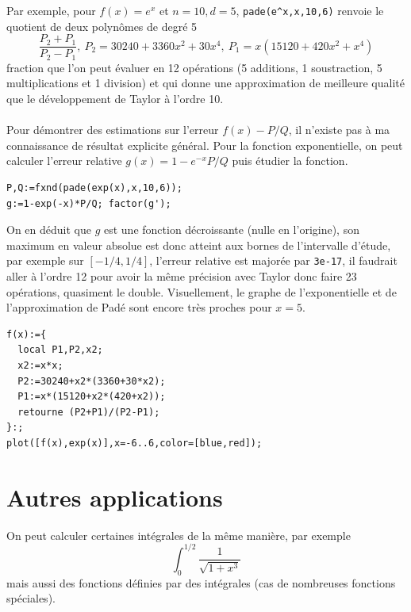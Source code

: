 \documentclass[a4paper,11pt]{book}
\begin{document}
\begin{giacjshere}
Par exemple, pour $f(x)=e^x$ et $n=10, d=5$, \verb|pade(e^x,x,10,6)|
renvoie le quotient de deux polyn\^omes de degré 5
$$ \frac{P_2+P_1}{P_2-P_1}, \ P_2=30240+3360x^2+30x^4,\ P_1=x(15120+420x^2+x^4)$$
fraction que l'on peut évaluer en 12 op\'erations (5 additions, 1
soustraction, 5 multiplications et 1 division)
et qui donne une approximation de meilleure qualité que le
développement de Taylor à l'ordre 10.\\
\\
Pour d\'emontrer des estimations sur l'erreur $f(x)-P/Q$, il n'existe
pas \`a ma connaissance de r\'esultat explicite g\'en\'eral. 
Pour la fonction exponentielle, on peut calculer l'erreur relative
$g(x)=1-e^{-x}P/Q$
puis \'etudier la fonction.
\begin{verbatim}
P,Q:=fxnd(pade(exp(x),x,10,6));
g:=1-exp(-x)*P/Q; factor(g');
\end{verbatim}
On en d\'eduit que $g$ est une fonction d\'ecroissante
(nulle en l'origine), son maximum en valeur absolue
est donc atteint aux bornes de l'intervalle d'\'etude, par
exemple sur $[-1/4,1/4]$, l'erreur relative est major\'ee
par \verb|3e-17|, il faudrait aller \`a l'ordre 12 pour
avoir la m\^eme pr\'ecision avec Taylor donc faire 23 op\'erations,
quasiment le double. Visuellement, le graphe de l'exponentielle et de
l'approximation de Pad\'e sont encore tr\`es proches pour $x=5$.
\begin{verbatim}
f(x):={
  local P1,P2,x2;
  x2:=x*x;
  P2:=30240+x2*(3360+30*x2);
  P1:=x*(15120+x2*(420+x2));
  retourne (P2+P1)/(P2-P1);
}:;
plot([f(x),exp(x)],x=-6..6,color=[blue,red]);
\end{verbatim}

\section{Autres applications}
On peut calculer certaines int\'egrales de la m\^eme mani\`ere,
par exemple
\[ \int _0^{1/2} \frac{1}{\sqrt{1+x^3}}\]
mais aussi des fonctions définies par des intégrales (cas de nombreuses
fonctions spéciales).


\end{giacjshere}
\end{document}
